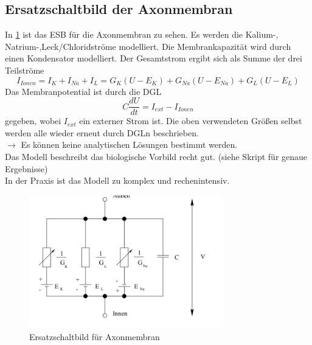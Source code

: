 \subsection{Ersatzschaltbild der Axonmembran}
In \ref{ch_bio_esb} ist das ESB für die Axonmembran zu sehen. Es werden die Kalium-, Natrium-,Leck/Chloridströme modelliert. Die Membrankapazität wird durch einen Kondensator modelliert. Der Gesamtstrom ergibt sich als Summe der drei Teilströme 
\begin{equation*}
    I_{Ionen} = I_K + I_{Na} + I_L = G_K(U-E_K) + G_{Na}(U-E_{Na}) + G_L(U-E_L)
\end{equation*}
Das Membranpotential ist durch die DGL
\begin{equation*}
    C\frac{dU}{dt} = I_{ext}-I_{Ionen}
\end{equation*}
gegeben, wobei $I_{ext}$ ein externer Strom ist. Die oben verwendeten Größen selbst werden alle wieder erneut durch DGLn beschrieben.\\
$\rightarrow$ Es können keine analytischen Lösungen bestimmt werden.\\
Das Modell beschreibt das biologische Vorbild recht gut. (siehe Skript für genaue Ergebnisse)\\
In der Praxis ist das Modell zu komplex und rechenintensiv.


\begin{figure}[h]
    \centering
    \includegraphics[width=0.75\textwidth]{img/BiologischesModell/ESB.png}
    \caption{Ersatzschaltbild für Axonmembran}
    \label{ch_bio_esb}
\end{figure}


